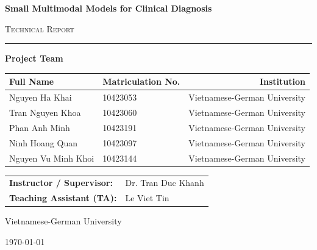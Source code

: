 \documentclass[11pt,a4paper]{report}
\begin{document}
\begin{titlepage}
    \centering
    \vspace*{1.5cm}
    
    {\Huge \bfseries Small Multimodal Models for Clinical Diagnosis\par}
    \vspace{0.8cm}
    {\Large \textsc{Technical Report}\par}
    \vspace{1.5cm}
    
    \rule{\linewidth}{0.8pt}
    \vspace{1cm}
    
    {\large \textbf{Project Team}\par}
    \vspace{0.5cm}
    
    \begin{tabular}{llr}
        \toprule
        \textbf{Full Name} & \textbf{Matriculation No.} & \textbf{Institution} \\
        \midrule
        Nguyen Ha Khai       & 10423053 & Vietnamese-German University \\
        Tran Nguyen Khoa     & 10423060 & Vietnamese-German University \\
        Phan Anh Minh        & 10423191 & Vietnamese-German University \\
        Ninh Hoang Quan      & 10423097 & Vietnamese-German University \\
        Nguyen Vu Minh Khoi  & 10423144 & Vietnamese-German University \\
        \bottomrule
    \end{tabular}
    
    \vspace{1cm}
    
    \begin{tabular}{ll}
        \textbf{Instructor / Supervisor:} & Dr. Tran Duc Khanh \\
        \textbf{Teaching Assistant (TA):} & Le Viet Tin \\
    \end{tabular}
    
    \vfill
    
    {\large Vietnamese-German University\par}
    \vspace{0.3cm}
    {\large \today\par}
\end{titlepage}
\end{document}
